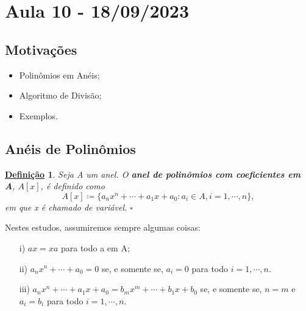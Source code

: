 \documentclass{article}
\newtheorem*{def*}{\underline{Defini\c c\~ao}}
\begin{document}
\section{Aula 10 - 18/09/2023}
\subsection{Motivações}
\begin{itemize}
  \item Polinômios em Anéis;
  \item Algoritmo de Divisão;
  \item Exemplos.
\end{itemize}
\subsection{Anéis de Polinômios}
\begin{def*}
  Seja A um anel. O \textbf{anel de polinômios com coeficientes em A}, \(A[x]\), é definido como 
  \[
    A[x]\coloneqq \{a_{n}x^{n}+\cdots+a_{1}x + a_{0}: a_{i}\in A, i = 1, \cdots, n\},
  \]
  em que x é chamado de variável. \(\square\)
\end{def*}
Nestes estudos, assumiremos sempre algumas coisas:
\begin{itemize}
  \item[i)] \(ax = xa\) para todo a em A;
  \item[ii)] \(a_{n}x^{n} + \cdots + a_{0} = 0\) se, e somente se, \(a_{i} = 0\) para todo \(i=1, \cdots, n.\)
  \item[iii)] \(a_{n}x^{n} + \cdots + a_{1}x + a_{0} = b_{m}x^{m} + \cdots + b_{1}x + b_{0}\) se, e somente se, \(n=m\) e \(a_{i} = b_{i}\) para todo \(i=1, \cdots, n\).
\end{itemize}
\end{document}
